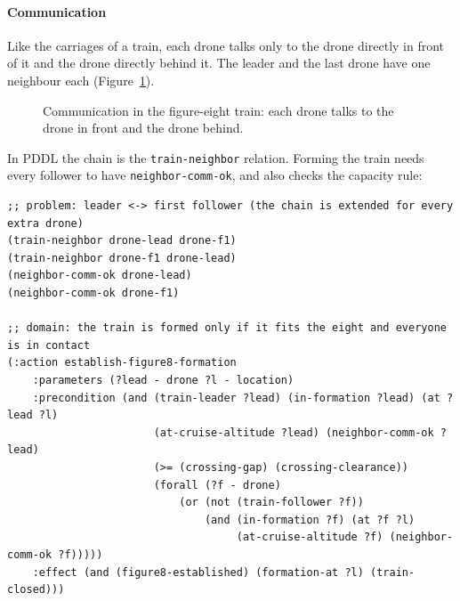 \documentclass[11pt,a4paper,oneside]{report}
\newcommand{\code}[1]{\texttt{#1}}
\begin{document}
\paragraph{Communication}
Like the carriages of a train, each drone talks only to the drone directly in front of it and
the drone directly behind it. The leader and the last drone have one neighbour each
(Figure~\ref{fig:comm-fig8}).

\begin{figure}[H]
\centering
{}
\caption[Communication in the figure-eight train]{Communication in the figure-eight train: each
drone talks to the drone in front and the drone behind.}
\label{fig:comm-fig8}
\end{figure}

\noindent In PDDL the chain is the \code{train-neighbor} relation. Forming the train needs every
follower to have \code{neighbor-comm-ok}, and also checks the capacity rule:

\begin{lstlisting}
;; problem: leader <-> first follower (the chain is extended for every extra drone)
(train-neighbor drone-lead drone-f1)
(train-neighbor drone-f1 drone-lead)
(neighbor-comm-ok drone-lead)
(neighbor-comm-ok drone-f1)

;; domain: the train is formed only if it fits the eight and everyone is in contact
(:action establish-figure8-formation
    :parameters (?lead - drone ?l - location)
    :precondition (and (train-leader ?lead) (in-formation ?lead) (at ?lead ?l)
                       (at-cruise-altitude ?lead) (neighbor-comm-ok ?lead)
                       (>= (crossing-gap) (crossing-clearance))
                       (forall (?f - drone)
                           (or (not (train-follower ?f))
                               (and (in-formation ?f) (at ?f ?l)
                                    (at-cruise-altitude ?f) (neighbor-comm-ok ?f)))))
    :effect (and (figure8-established) (formation-at ?l) (train-closed)))
\end{lstlisting}
\end{document}
